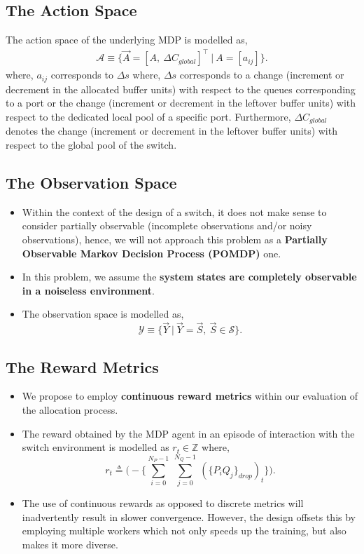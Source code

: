 \documentclass{article}
\begin{document}
\subsection{The Action Space}
The action space of the underlying MDP is modelled as,
\begin{equation}
    \begin{aligned}
        \mathcal{A} \equiv \{\vec{A} = [A,\ \Delta C_{global}]^\intercal\ |\ A = [a_{ij}]\}.
    \end{aligned}
\end{equation}
where, $a_{ij}$ corresponds to $\Delta s$ where, $\Delta s$ corresponds to a change (increment or decrement in the allocated buffer units) with respect to the queues corresponding to a port or the change (increment or decrement in the leftover buffer units) with respect to the dedicated local pool of a specific port. Furthermore, $\Delta C_{global}$ denotes the change (increment or decrement in the leftover buffer units) with respect to the global pool of the switch.
\subsection{The Observation Space}
\begin{itemize}
    \item Within the context of the design of a switch, it does not make sense to consider partially observable (incomplete observations and/or noisy observations), hence, we will not approach this problem as a \textbf{Partially Observable Markov Decision Process (POMDP)} one.
    \item In this problem, we assume the \textbf{system states are completely observable in a noiseless environment}.
    \item The observation space is modelled as,
    \begin{equation}
        \mathcal{Y} \equiv \{\vec{Y}\ |\ \vec{Y} = \vec{S},\ \vec{S} \in \mathcal{S}\}.
    \end{equation}
\end{itemize}
\subsection{The Reward Metrics}
\begin{itemize}
    \item We propose to employ \textbf{continuous reward metrics} within our evaluation of the allocation process.
    \item The reward obtained by the MDP agent in an episode of interaction with the switch environment is modelled as $r_t \in \mathbb{Z}$ where,
    \begin{equation}
        r_{t} \triangleq \Big(- \Big\{\sum_{i=0}^{N_P-1}\ \sum_{j=0}^{N_Q-1}\ (\{P_i Q_j\}_{drop})_t\Big\}\Big).
    \end{equation}
    \item The use of continuous rewards as opposed to discrete metrics will inadvertently result in slower convergence. However, the design offsets this by employing multiple workers which not only speeds up the training, but also makes it more diverse.
\end{itemize}
\end{document}
